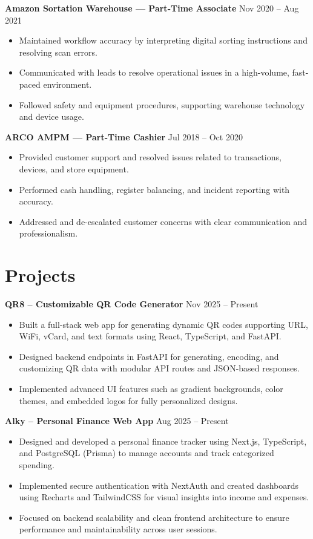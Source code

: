 \documentclass[a4paper,9.5pt]{article}
\newcommand{\dateright}[1]{\hfill {\small\textnormal{#1}}}
\begin{document}
\textbf{Amazon Sortation Warehouse — Part-Time Associate} \dateright{Nov 2020 – Aug 2021}
\begin{itemize}
  \item Maintained workflow accuracy by interpreting digital sorting instructions and resolving scan errors.
  \item Communicated with leads to resolve operational issues in a high-volume, fast-paced environment.
  \item Followed safety and equipment procedures, supporting warehouse technology and device usage.
\end{itemize}

\textbf{ARCO AMPM — Part-Time Cashier} \dateright{Jul 2018 – Oct 2020}
\begin{itemize}
  \item Provided customer support and resolved issues related to transactions, devices, and store equipment.
  \item Performed cash handling, register balancing, and incident reporting with accuracy.
  \item Addressed and de-escalated customer concerns with clear communication and professionalism.
\end{itemize}

\section*{Projects}

\textbf{QR8 – Customizable QR Code Generator} \dateright{Nov 2025 – Present}
\begin{itemize}
  \item Built a full-stack web app for generating dynamic QR codes supporting URL, WiFi, vCard, and text formats using React, TypeScript, and FastAPI.
  \item Designed backend endpoints in FastAPI for generating, encoding, and customizing QR data with modular API routes and JSON-based responses.
  \item Implemented advanced UI features such as gradient backgrounds, color themes, and embedded logos for fully personalized designs.
\end{itemize}

\textbf{Alky – Personal Finance Web App} \dateright{Aug 2025 – Present}
\begin{itemize}
  \item Designed and developed a personal finance tracker using Next.js, TypeScript, and PostgreSQL (Prisma) to manage accounts and track categorized spending.
  \item Implemented secure authentication with NextAuth and created dashboards using Recharts and TailwindCSS for visual insights into income and expenses.
  \item Focused on backend scalability and clean frontend architecture to ensure performance and maintainability across user sessions.
\end{itemize}
\end{document}

